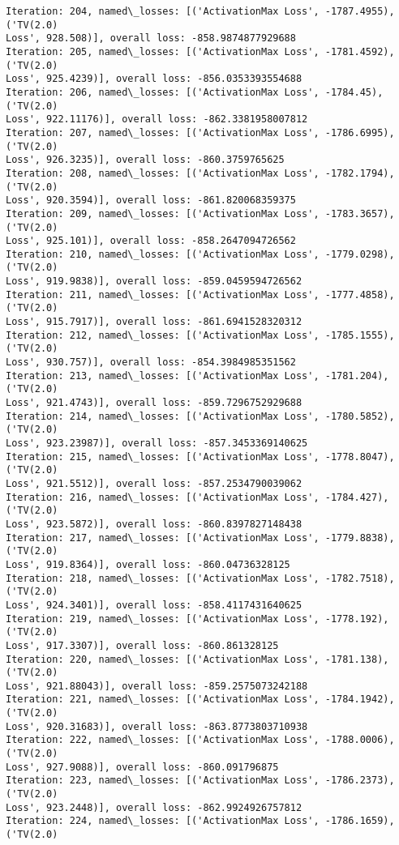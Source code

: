 \documentclass[10pt]{article}
\begin{document}
\begin{Verbatim}[commandchars=\\\{\}]
Iteration: 204, named\_losses: [('ActivationMax Loss', -1787.4955), ('TV(2.0)
Loss', 928.508)], overall loss: -858.9874877929688
Iteration: 205, named\_losses: [('ActivationMax Loss', -1781.4592), ('TV(2.0)
Loss', 925.4239)], overall loss: -856.0353393554688
Iteration: 206, named\_losses: [('ActivationMax Loss', -1784.45), ('TV(2.0)
Loss', 922.11176)], overall loss: -862.3381958007812
Iteration: 207, named\_losses: [('ActivationMax Loss', -1786.6995), ('TV(2.0)
Loss', 926.3235)], overall loss: -860.3759765625
Iteration: 208, named\_losses: [('ActivationMax Loss', -1782.1794), ('TV(2.0)
Loss', 920.3594)], overall loss: -861.820068359375
Iteration: 209, named\_losses: [('ActivationMax Loss', -1783.3657), ('TV(2.0)
Loss', 925.101)], overall loss: -858.2647094726562
Iteration: 210, named\_losses: [('ActivationMax Loss', -1779.0298), ('TV(2.0)
Loss', 919.9838)], overall loss: -859.0459594726562
Iteration: 211, named\_losses: [('ActivationMax Loss', -1777.4858), ('TV(2.0)
Loss', 915.7917)], overall loss: -861.6941528320312
Iteration: 212, named\_losses: [('ActivationMax Loss', -1785.1555), ('TV(2.0)
Loss', 930.757)], overall loss: -854.3984985351562
Iteration: 213, named\_losses: [('ActivationMax Loss', -1781.204), ('TV(2.0)
Loss', 921.4743)], overall loss: -859.7296752929688
Iteration: 214, named\_losses: [('ActivationMax Loss', -1780.5852), ('TV(2.0)
Loss', 923.23987)], overall loss: -857.3453369140625
Iteration: 215, named\_losses: [('ActivationMax Loss', -1778.8047), ('TV(2.0)
Loss', 921.5512)], overall loss: -857.2534790039062
Iteration: 216, named\_losses: [('ActivationMax Loss', -1784.427), ('TV(2.0)
Loss', 923.5872)], overall loss: -860.8397827148438
Iteration: 217, named\_losses: [('ActivationMax Loss', -1779.8838), ('TV(2.0)
Loss', 919.8364)], overall loss: -860.04736328125
Iteration: 218, named\_losses: [('ActivationMax Loss', -1782.7518), ('TV(2.0)
Loss', 924.3401)], overall loss: -858.4117431640625
Iteration: 219, named\_losses: [('ActivationMax Loss', -1778.192), ('TV(2.0)
Loss', 917.3307)], overall loss: -860.861328125
Iteration: 220, named\_losses: [('ActivationMax Loss', -1781.138), ('TV(2.0)
Loss', 921.88043)], overall loss: -859.2575073242188
Iteration: 221, named\_losses: [('ActivationMax Loss', -1784.1942), ('TV(2.0)
Loss', 920.31683)], overall loss: -863.8773803710938
Iteration: 222, named\_losses: [('ActivationMax Loss', -1788.0006), ('TV(2.0)
Loss', 927.9088)], overall loss: -860.091796875
Iteration: 223, named\_losses: [('ActivationMax Loss', -1786.2373), ('TV(2.0)
Loss', 923.2448)], overall loss: -862.9924926757812
Iteration: 224, named\_losses: [('ActivationMax Loss', -1786.1659), ('TV(2.0)

\end{Verbatim}
\end{document}
